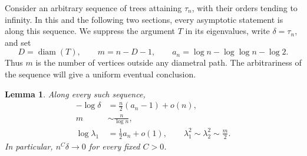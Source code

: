 \documentclass[11pt,a4paper]{article}
\numberwithin{equation}{section}
\newtheorem{lemma}[theorem]{Lemma}
\theoremstyle{definition}
\theoremstyle{remark}
\begin{document}
Consider an arbitrary sequence of trees attaining $\tau_n$, with their
orders tending to infinity. In this and the following two sections, every
asymptotic statement is along this sequence. We suppress the argument $T$
in its eigenvalues, write $\delta=\tau_n$, and set
\[
 D=\operatorname{diam}(T),\qquad m=n-D-1,\qquad
 a_n=\log n-\log\log n-\log 2.
\]
Thus $m$ is the number of vertices outside any diametral path. The
arbitrariness of the sequence will give a uniform eventual conclusion.

\begin{lemma}\label{tree:scales}
Along every such sequence,
\begin{align}
 -\log\delta&=\frac n2(a_n-1)+o(n),\label{tree:gap-scale}\\
 m&\sim\frac{n}{\log n},\label{tree:m-scale}\\
 \log\lambda_1&=\frac12a_n+o(1),\qquad
 \lambda_1^2\sim\lambda_2^2\sim\frac m2.\label{tree:eigen-scale}
\end{align}
In particular, $n^C\delta\longrightarrow0$ for every fixed $C>0$.
\end{lemma}
\end{document}
